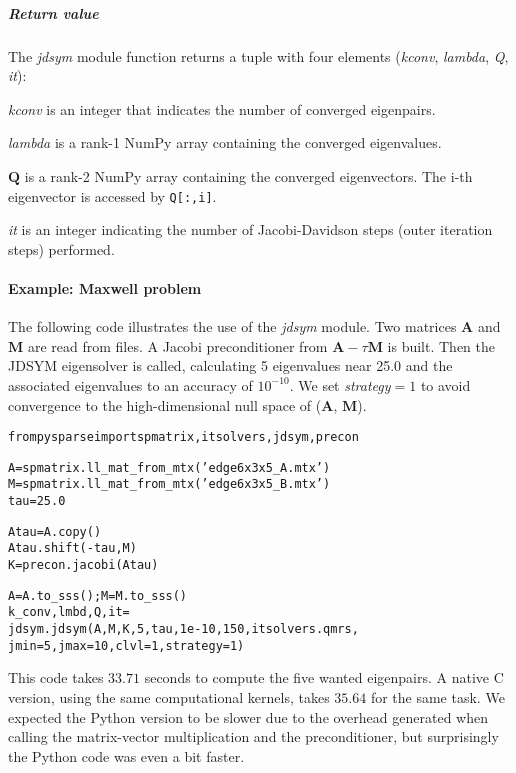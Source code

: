 \documentclass[a4paper]{article}
\newcommand{\mat}[1]{\ensuremath{\boldsymbol{#1}}}
\newlength{\pyindent} \newlength{\pyminipagewidth}
\newenvironment{pycode}{\begin{trivlist}\item\hspace*{\pyindent}\begin{minipage}{\pyminipagewidth}\small\begin{alltt}}
      {\end{alltt}\end{minipage}\end{trivlist}}
\newenvironment{arglist} {\begin{list}{}{\setlength{\leftmargin}{4em}\setlength{\itemsep}{0cm}\setlength{\labelwidth}{3em}}}
  {\end{list}}
\begin{document}
\subparagraph{Return value}
%
\noindent The \textit{jdsym} module function returns a tuple with four elements
(\textit{kconv}, \textit{lambda}, \textit{Q}, \textit{it}):

\begin{arglist}
\item[\textit{kconv}] is an integer that indicates the number of
  converged eigenpairs.
\item[\textit{lambda}] is a rank-1 NumPy array containing the
  converged eigenvalues.
\item[$\mat{Q}$] is a rank-2 NumPy array containing the converged
  eigenvectors. The i-th eigenvector is accessed by \texttt{Q[:,i]}.
\item[\textit{it}] is an integer indicating the number of
  Jacobi-Davidson steps (outer iteration steps) performed.
\end{arglist}

\paragraph{Example: Maxwell problem}
The following code illustrates the use of the \textit{jdsym} module.
Two matrices $\mat{A}$ and $\mat{M}$ are read from files. A Jacobi
preconditioner from $\mat{A} - \tau\mat{M}$ is built. Then the JDSYM
eigensolver is called, calculating 5 eigenvalues near 25.0 and the
associated eigenvalues to an accuracy of $10^{-10}$.  We set
\textit{strategy}${}=1$ to avoid convergence to the high-dimensional
null space of ($\mat{A}$, $\mat{M}$).
\begin{pycode}
from pysparse import spmatrix, itsolvers, jdsym, precon

A = spmatrix.ll_mat_from_mtx('edge6x3x5_A.mtx')
M = spmatrix.ll_mat_from_mtx('edge6x3x5_B.mtx')
tau = 25.0

Atau = A.copy()
Atau.shift(-tau, M)
K = precon.jacobi(Atau)

A = A.to_sss(); M = M.to_sss()
k_conv, lmbd, Q, it  = 
      jdsym.jdsym(A, M, K, 5, tau, 1e-10, 150, itsolvers.qmrs,
                  jmin=5, jmax=10, clvl=1, strategy=1)
\end{pycode}
This code takes $33.71$ seconds to compute the five wanted eigenpairs.
A native C version, using the same computational kernels, takes
$35.64$ for the same task. We expected the Python version to be slower
due to the overhead generated when calling the matrix-vector
multiplication and the preconditioner, but surprisingly the Python
code was even a bit faster.
\end{document}
